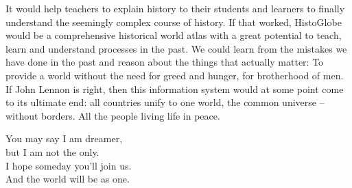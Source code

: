 It would help teachers to explain history to their students and learners to finally understand the seemingly complex course of history. If that worked, HistoGlobe would be a comprehensive historical world atlas with a great potential to teach, learn and understand processes in the past. We could learn from the mistakes we have done in the past and reason about the things that actually matter: To provide a world without the need for greed and hunger, for brotherhood of men. If John Lennon is right, then this information system would at some point come to its ultimate end: all countries unify to one world, the common universe -- without borders. All the people living life in peace.

\vspace{2em}
\begin{large}
\begin{quoteright}
  You may say I am dreamer, \\
  but I am not the only. \\
  I hope someday you'll join us. \\
  And the world will be as one.
\end{quoteright}
\end{large}





